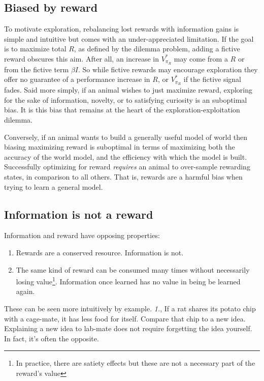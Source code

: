 \documentclass[9pt,twocolumn,twoside]{pnas-new}
\begin{document}
\subsection*{Biased by reward}
To motivate exploration, rebalancing lost rewards with information gains is simple and intuitive but comes with an under-appreciated limitation. If the goal is to maximize total $R$, as defined by the dilemma problem, adding a fictive reward obscures this aim. After all, an increase in $V^{*}_{\pi_R}$ may come from a $R$ or from the fictive term $\beta I$. So while fictive rewards may encourage exploration they offer no guarantee of a performance increase in $R$, or $V^{*}_{\pi_R}$ if the fictive signal fades. Said more simply, if an animal wishes to just maximize reward, exploring for the sake of information, novelty, or to satisfying curiosity is an suboptimal bias. It is this bias that remains at the heart of the exploration-exploitation dilemma.

Conversely, if an animal wants to build a generally useful model of world then biasing maximizing reward is suboptimal in terms of maximizing both the accuracy of the world model, and the efficiency with which the model is built. Successfully optimizing for reward \textit{requires} an animal to over-sample rewarding states, in comparison to all others. That is, rewards are a harmful bias when trying to learn a general model.


\subsection*{Information is not a reward}
Information and reward have opposing properties:

\begin{enumerate}[noitemsep,wide=0pt,leftmargin=\dimexpr\labelwidth]
    \item Rewards are a conserved resource. Information is not. 
    \item The same kind of reward can be consumed many times without necessarily losing value\footnote{In practice, there are satiety effects but these are not a necessary part of the reward's value}. Information once learned has no value in being be learned again.
\end{enumerate}

These can be seen more intuitively by example. \textit{1.}, If a rat shares its potato chip with a cage-mate, it has less food for itself. Compare that chip to a new idea. Explaining a new idea to lab-mate does not require forgetting the idea yourself. In fact, it's often the opposite.
\end{document}

